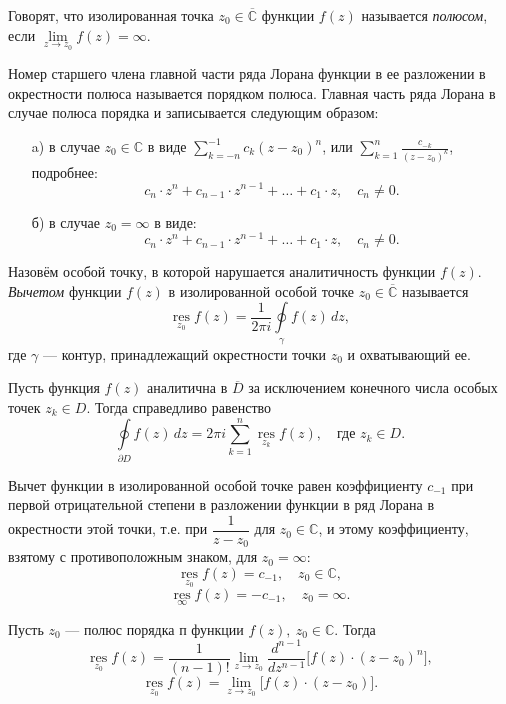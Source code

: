 \begin{definition}
Говорят, что изолированная точка $z_0\in \overline{\mathbb{C}}$ функции $f(z)$ называется \textit{полюсом}, если $\lim\limits_{z\to z_0}f(z)=\infty$.
\end{definition}

\begin{remark}
Номер старшего члена главной части ряда Лорана функции в ее разложении в окрестности полюса называется порядком полюса.
Главная часть ряда Лорана в случае полюса порядка и записывается следующим образом:
\begin{itemize}
\item[a)] в случае $z_0\in\mathbb{C}$ в виде $\sum_{k=-n}^{-1} c_k(z-z_0)^n$, или $\sum_{k=1}^{n} \frac{c_{-k}}{(z-z_0)^k}$, подробнее:
$$
c_n\cdot z^n+ c_{n-1}\cdot z^{n-1}+\ldots+c_1\cdot z,\quad c_n\ne0.
$$
\item[б)] в случае $z_0=\infty$ в виде:
$$
c_n\cdot z^n+ c_{n-1}\cdot z^{n-1}+\ldots+c_1\cdot z,\quad c_n\ne0.
$$
\end{itemize}
\end{remark}

\begin{definition}
        Назовём особой точку, в которой нарушается аналитичность функции $f(z)$.
        \textit{Вычетом} функции $f(z)$ в изолированной особой точке $z_0 \in \overline{\mathbb{C}}$ называется
$$
        \mathop{\operatorname{res}}\limits_{z_0}f(z)
        =
        \frac{1}{2\pi i}\oint\limits_{\gamma} f(z)\,dz,
$$
где $\gamma$ — контур, принадлежащий окрестности точки $z_0$ и охватывающий ее. 
\end{definition}

\begin{theorem}
        Пусть функция $f(z)$ аналитична в $\overline{D}$ за исключением конечного числа особых точек $z_k\in D$. Тогда справедливо равенство
$$
        \oint\limits_{\partial D}f(z)\,dz
        = 
        2\pi i \sum_{k=1}^{n} \mathop{\operatorname{res}}\limits_{z_k} f(z),\quad\mbox{где } z_k\in D.
$$
\end{theorem}

\begin{assertion}
Вычет функции в изолированной особой точке равен коэффициенту $c_{-1}$ при первой отрицательной степени в разложении функции в ряд Лорана в окрестности этой точки, т.е. при $\dfrac{1}{z-z_0}$ для $z_0\in \mathbb{C}$, и этому коэффициенту, взятому с противоположным знаком, для $z_0=\infty\colon$
$$
\mathop{\operatorname{res}}\limits_{z_0}f(z)=c_{-1},\quad z_0\in \mathbb{C},$$
$$
\mathop{\operatorname{res}}\limits_{\infty} f(z)=-c_{-1},\quad z_0=\infty.
$$
\end{assertion}
\begin{assertion}
Пусть $z_0$ --- полюс порядка п функции $f(z),~ z_0\in \mathbb{C}$. Тогда
$$
\mathop{\operatorname{res}}\limits_{z_0}f(z)= \frac{1}{(n-1)!} \lim\limits_{z\to z_0} \frac{d^{n-1}}{dz^{n-1}} \bigl[f(z)\cdot (z-z_0)^n\bigr],
$$
$$
\mathop{\operatorname{res}}\limits_{z_0}f(z)= \lim\limits_{z\to z_0} \bigl[f(z)\cdot (z-z_0)\bigr].
$$ 
\end{assertion}


